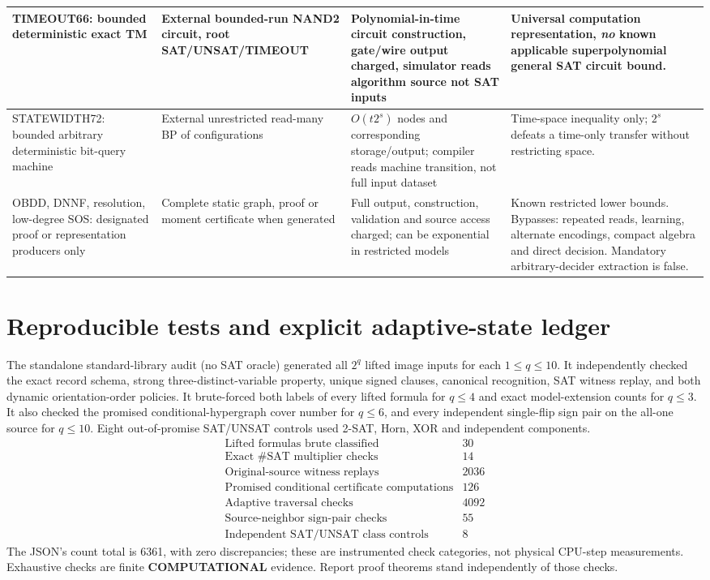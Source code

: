 \documentclass[11pt]{article}
\begin{document}
\begin{longtable}{p{.15\linewidth}p{.175\linewidth}p{.255\linewidth}p{.25\linewidth}}
TIMEOUT66: bounded deterministic exact TM &
External bounded-run NAND2 circuit, root SAT/UNSAT/TIMEOUT &
Polynomial-in-time circuit construction, gate/wire
output charged, simulator reads algorithm source not SAT inputs &
Universal computation representation, \emph{no}
known applicable superpolynomial general SAT circuit bound.\\\midrule
STATEWIDTH72: bounded arbitrary deterministic bit-query machine &
External unrestricted read-many BP of configurations &
$O(t2^s)$ nodes and corresponding storage/output;
compiler reads machine transition, not full input dataset &
Time-space inequality only; $2^s$ defeats
a time-only transfer without restricting space.\\\midrule
OBDD, DNNF, resolution, low-degree SOS: designated proof
or representation producers only &
Complete static graph, proof or moment certificate when generated &
Full output, construction, validation and source access charged;
can be exponential in restricted models &
Known restricted lower bounds. Bypasses: repeated reads,
learning, alternate encodings, compact algebra and direct decision.
Mandatory arbitrary-decider extraction is false.\\\bottomrule
\end{longtable}
\normalsize

\section{Reproducible tests and explicit adaptive-state ledger}
The standalone standard-library audit (no SAT oracle) generated
all $2^q$ lifted image inputs for each $1\le q\le10$.
It independently checked the exact record schema, strong
three-distinct-variable property, unique signed clauses,
canonical recognition, SAT witness replay, and both dynamic
orientation-order policies. It brute-forced both labels of every
lifted formula for $q\le4$ and exact model-extension counts for
$q\le3$. It also checked the promised conditional-hypergraph
cover number for $q\le6$, and every independent single-flip
sign pair on the all-one source for $q\le10$.
Eight out-of-promise SAT/UNSAT controls used 2-SAT, Horn,
XOR and independent components.
\[
\begin{array}{lr}
\text{Lifted formulas brute classified} & 30\\
\text{Exact \#SAT multiplier checks} &14\\
\text{Original-source witness replays} &2036\\
\text{Promised conditional certificate computations}&126\\
\text{Adaptive traversal checks} &4092\\
\text{Source-neighbor sign-pair checks}&55\\
\text{Independent SAT/UNSAT class controls}&8
\end{array}
\]
The JSON's count total is 6361, with zero discrepancies;
these are instrumented check categories, not physical
CPU-step measurements. Exhaustive checks are finite
\textbf{COMPUTATIONAL} evidence. Report proof theorems
stand independently of those checks.
\end{document}
